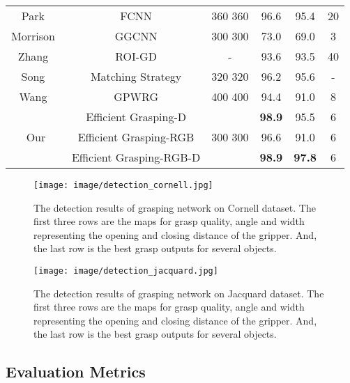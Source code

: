 \documentclass[journal]{IEEEtran}
\begin{document}
\begin{table*}[htbp]
\begin{center}
\begin{tabular}{c|c|c|c|c|c}
		    Park~\cite{DBLP}& FCNN & 360 360 &  96.6 & 95.4& 20\\
		    Morrison~\cite{ggcnn}& GGCNN & 300 300 &  73.0 & 69.0& 3\\
		    Zhang~\cite{roi}& ROI-GD & - &  93.6 & 93.5& 40\\
		    Song~\cite{ggcnn}& Matching Strategy & 320 320 &  96.2 & 95.6& -\\
		    Wang~\cite{25_wang}& GPWRG & 400 400 &  94.4 & 91.0& 8\\
			\hline
			\multirow{3}{*}{Our}& Efficient Grasping-D & \multirow{3}{*}{300 300} &  \textbf{98.9} & 95.5& 6\\
			& Efficient Grasping-RGB &  &  96.6 & 91.0& 6\\
			& Efficient Grasping-RGB-D &  & \textbf{98.9} & \textbf{97.8}& 6\\
			\hline
		\end{tabular}
	\end{center}
	\label{tab:detectioncornell}
\end{table*}






\begin{figure}[thbp!]
	\centering 
	\setlength{\belowcaptionskip}{-10pt}       
	{\texttt{[image: image/detection\_cornell.jpg]}}
	\caption{The detection results of grasping network on Cornell dataset. The first three rows are the maps for grasp quality, angle and width representing the opening and closing distance of the gripper. And, the last row is the best grasp outputs for several objects.}
	\label{fig:detection_cornell}
\end{figure} 

\begin{figure}[thbp!]
	\centering 
	\setlength{\belowcaptionskip}{-10pt}       
	{\texttt{[image: image/detection\_jacquard.jpg]}}
	\caption{The detection results of grasping network on Jacquard dataset. The first three rows are the maps for grasp quality, angle and width representing the opening and closing distance of the gripper. And, the last row is the best grasp outputs for several objects. }
	\label{fig:detection_jacquard}
\end{figure} 


\subsection{Evaluation Metrics}
\label{metric}
\end{document}
